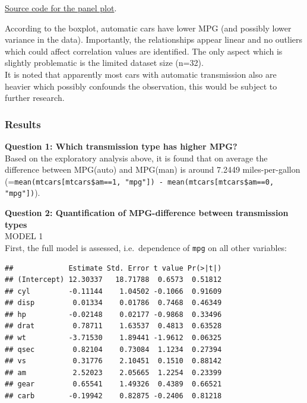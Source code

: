 \documentclass[]{article}
\newenvironment{Shaded}{\begin{snugshade}}{\end{snugshade}}
\newcommand{\KeywordTok}[1]{\textcolor[rgb]{0.13,0.29,0.53}{\textbf{{#1}}}}
\newcommand{\DataTypeTok}[1]{\textcolor[rgb]{0.13,0.29,0.53}{{#1}}}
\newcommand{\StringTok}[1]{\textcolor[rgb]{0.31,0.60,0.02}{{#1}}}
\newcommand{\NormalTok}[1]{{#1}}
\begin{document}
\href{https://github.com/mzhKU/regmods_course_project/blob/master/multiplot.R}{Source
code for the panel plot}.

According to the boxplot, automatic cars have lower MPG (and possibly
lower variance in the data). Importantly, the relationships appear
linear and no outliers which could affect correlation values are
identified. The only aspect which is slightly problematic is the limited
dataset size (n=32).\\It is noted that apparently most cars with
automatic transmission also are heavier which possibly confounds the
observation, this would be subject to further research.

\subsubsection{Results}\label{results}

\textbf{Question 1: Which transmission type has higher MPG?}\\Based on
the exploratory analysis above, it is found that on average the
difference between MPG(auto) and MPG(man) is around 7.2449
miles-per-gallon
(=\texttt{mean(mtcars{[}mtcars\$am==1, "mpg"{]}) - mean(mtcars{[}mtcars\$am==0, "mpg"{]})}).

\textbf{Question 2: Quantification of MPG-difference between
transmission types}\\MODEL 1\\First, the full model is assessed,
i.e.~dependence of \texttt{mpg} on all other variables:

\begin{Shaded}
\end{Shaded}

\begin{verbatim}
##             Estimate Std. Error t value Pr(>|t|)
## (Intercept) 12.30337   18.71788  0.6573  0.51812
## cyl         -0.11144    1.04502 -0.1066  0.91609
## disp         0.01334    0.01786  0.7468  0.46349
## hp          -0.02148    0.02177 -0.9868  0.33496
## drat         0.78711    1.63537  0.4813  0.63528
## wt          -3.71530    1.89441 -1.9612  0.06325
## qsec         0.82104    0.73084  1.1234  0.27394
## vs           0.31776    2.10451  0.1510  0.88142
## am           2.52023    2.05665  1.2254  0.23399
## gear         0.65541    1.49326  0.4389  0.66521
## carb        -0.19942    0.82875 -0.2406  0.81218
\end{verbatim}
\end{document}
